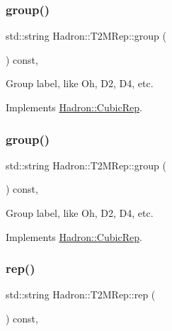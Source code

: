 \subsubsection{\texorpdfstring{group()}{group()}\hspace{0.1cm}{\footnotesize\ttfamily [2/3]}}
{\footnotesize\ttfamily std\+::string Hadron\+::\+T2\+M\+Rep\+::group (\begin{DoxyParamCaption}{ }\end{DoxyParamCaption}) const\hspace{0.3cm}{\ttfamily [inline]}, {\ttfamily [virtual]}}

Group label, like Oh, D2, D4, etc. 

Implements \mbox{\hyperlink{structHadron_1_1CubicRep_a0748f11ec87f387062c8e8981339a29c}{Hadron\+::\+Cubic\+Rep}}.

\mbox{\label{structHadron_1_1T2MRep_a1326313751ae23194da5dcb326ac44a1}} 
\subsubsection{\texorpdfstring{group()}{group()}\hspace{0.1cm}{\footnotesize\ttfamily [3/3]}}
{\footnotesize\ttfamily std\+::string Hadron\+::\+T2\+M\+Rep\+::group (\begin{DoxyParamCaption}{ }\end{DoxyParamCaption}) const\hspace{0.3cm}{\ttfamily [inline]}, {\ttfamily [virtual]}}

Group label, like Oh, D2, D4, etc. 

Implements \mbox{\hyperlink{structHadron_1_1CubicRep_a0748f11ec87f387062c8e8981339a29c}{Hadron\+::\+Cubic\+Rep}}.

\mbox{\label{structHadron_1_1T2MRep_aa55b94a93f3336ef06369b8e2d544160}} 
\subsubsection{\texorpdfstring{rep()}{rep()}\hspace{0.1cm}{\footnotesize\ttfamily [1/3]}}
{\footnotesize\ttfamily std\+::string Hadron\+::\+T2\+M\+Rep\+::rep (\begin{DoxyParamCaption}{ }\end{DoxyParamCaption}) const\hspace{0.3cm}{\ttfamily [inline]}, {\ttfamily [virtual]}}

